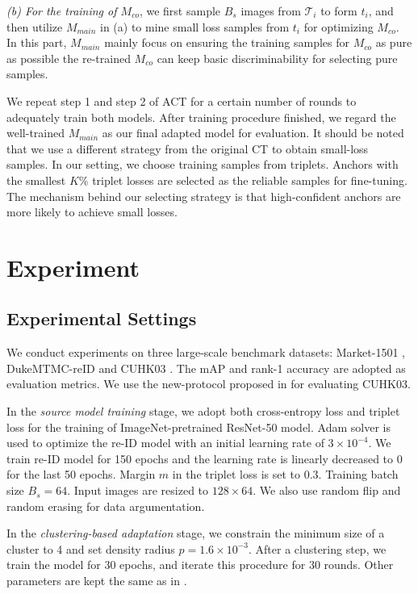 \documentclass[letterpaper]{article} \usepackage{aaai20}  \usepackage{times}  \usepackage{helvet} \usepackage{courier}  \usepackage[hyphens]{url}  \usepackage{graphicx} \urlstyle{rm} \def\UrlFont{\rm}  \usepackage{graphicx}  \frenchspacing  \setlength{\pdfpagewidth}{8.5in}  \setlength{\pdfpageheight}{11in}  \usepackage{color}
\begin{document}
\textit{(b)	For the training of $M_{co}$}, we first sample $B_s$ images from $\mathcal{T}_i$ to form $t_i$, and then utilize $M_{main}$ in (a) to mine small loss samples from $t_i$ for optimizing $M_{co}$. In this part, $M_{main}$ mainly focus on ensuring the training samples for $M_{co}$ as pure as possible the re-trained $M_{co}$ can keep basic discriminability for selecting pure samples. 


We repeat step 1 and step 2 of ACT for a certain number of rounds to adequately train both models. After training procedure finished, we regard the well-trained $M_{main}$ as our final adapted model for evaluation. It should be noted that we use a different strategy from the original CT to obtain small-loss samples. In our setting, we choose training samples from triplets. Anchors with the smallest $K$\% triplet losses are selected as the reliable samples for fine-tuning. The mechanism behind our selecting strategy is that high-confident anchors are more likely to achieve small losses.


\section{Experiment}
\label{sec:exp}

\subsection{Experimental Settings}
We conduct experiments on three large-scale benchmark datasets: Market-1501 \cite{zheng2015scalable}, DukeMTMC-reID \cite{ristani2016MTMC,zheng2017unlabeled} and CUHK03 \cite{CUHK03}. The mAP and rank-1 accuracy are adopted as evaluation metrics. We use the new-protocol proposed in \cite{zhong2017re} for evaluating CUHK03.

In the \textit{source model training} stage, we adopt both cross-entropy loss and triplet loss for the training of ImageNet-pretrained ResNet-50 model. Adam solver is used to optimize the re-ID model with an initial learning rate of $3 \times 10^{-4}$. We train re-ID model for 150 epochs and the learning rate is linearly decreased to 0 for the last 50 epochs. Margin $m$ in the triplet loss is set to $0.3$. Training batch size $B_s=64$. Input images are resized to $128 \times 64$. We also use random flip and random erasing \cite{RE} for data argumentation.

In the \textit{clustering-based adaptation} stage, we constrain the minimum size of a cluster to 4 and set density radius $p=1.6 \times 10^{-3}$. After a clustering step, we train the model for 30 epochs, and iterate this procedure for 30 rounds. Other parameters are kept the same as in \cite{song2018unsupervised}.
\end{document}
